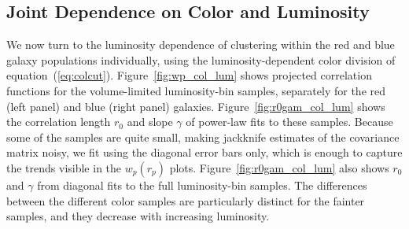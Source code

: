 \documentclass[]{emulateapj}
\newcommand{\wrp}{{w_p(r_p)}}
\begin{document}
\subsection{Joint Dependence on Color and Luminosity}
\label{subsec:collum}

We now turn to the luminosity dependence of clustering within the
red and blue galaxy populations individually, using the luminosity-dependent
color division of equation~(\ref{eq:colcut}).
Figure~\ref{fig:wp_col_lum} shows projected correlation functions
for the volume-limited luminosity-bin samples, separately for the
red (left panel) and blue (right panel) galaxies.  
Figure~\ref{fig:r0gam_col_lum} shows the correlation length
$r_0$ and slope $\gamma$ of power-law fits to these samples.
Because some of the samples are quite small, making
jackknife estimates of the covariance matrix noisy, we
fit using the diagonal error bars only, which is enough to
capture the trends visible in the $\wrp$ plots.  
Figure~\ref{fig:r0gam_col_lum} also shows $r_0$ and $\gamma$
from diagonal fits to the full luminosity-bin samples.
The differences between the different color samples are particularly
distinct for the fainter samples, and they
decrease with increasing luminosity.

\begin{figure*}[tbp]
\caption[]{\label{fig:wp_col_lum}
Projected correlation functions for different luminosity-bin samples,
shown separately for red galaxies (left) and blue galaxies (right).
For clarity, the brightest and faintest blue samples 
have been omitted from the plot, as their correlation functions
are noisy.
}
\end{figure*}

\begin{figure*}[tbp]
\caption[]{\label{fig:r0gam_col_lum}
Luminosity and color dependence of the galaxy correlation function.
The plots show the correlation lengths (left) and slopes (right) corresponding
to the real-space correlation function obtained from power-law fits to 
projected correlation functions using the diagonal errors.  These are shown 
for the blue, red and full populations of the luminosity-bin samples.
Points are plotted at the luminosity of the bin center, divided by
$L_*$, which is taken to be $M_r=-20.5$.
}
\end{figure*}
\end{document}
